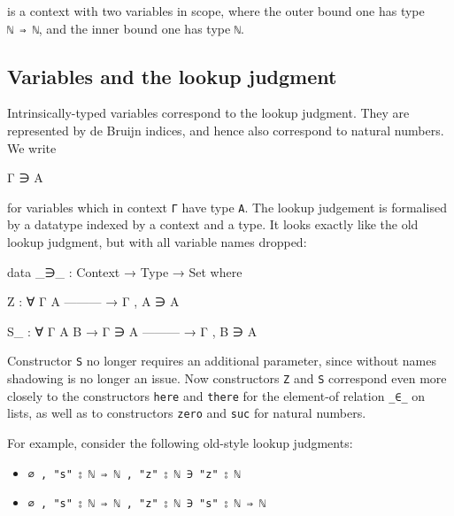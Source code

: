 is a context with two variables in scope, where the outer bound one has
type \texttt{\textasciigrave{}ℕ\ ⇒\ \textasciigrave{}ℕ}, and the inner
bound one has type \texttt{\textasciigrave{}ℕ}.

\hypertarget{variables-and-the-lookup-judgment}{%
\subsection{Variables and the lookup
judgment}\label{variables-and-the-lookup-judgment}}

Intrinsically-typed variables correspond to the lookup judgment. They
are represented by de Bruijn indices, and hence also correspond to
natural numbers. We write

\begin{myDisplay}
Γ ∋ A
\end{myDisplay}

for variables which in context \texttt{Γ} have type \texttt{A}. The
lookup judgement is formalised by a datatype indexed by a context and a
type. It looks exactly like the old lookup judgment, but with all
variable names dropped:

\begin{fence}
\begin{code}
data _∋_ : Context → Type → Set where

  Z : ∀ {Γ A}
      ---------
    → Γ , A ∋ A

  S_ : ∀ {Γ A B}
    → Γ ∋ A
      ---------
    → Γ , B ∋ A
\end{code}
\end{fence}

Constructor \texttt{S} no longer requires an additional parameter, since
without names shadowing is no longer an issue. Now constructors
\texttt{Z} and \texttt{S} correspond even more closely to the
constructors \texttt{here} and \texttt{there} for the element-of
relation \texttt{\_∈\_} on lists, as well as to constructors
\texttt{zero} and \texttt{suc} for natural numbers.

For example, consider the following old-style lookup judgments:

\begin{itemize}
\tightlist
\item
  \texttt{∅\ ,\ "s"\ ⦂\ \textasciigrave{}ℕ\ ⇒\ \textasciigrave{}ℕ\ ,\ "z"\ ⦂\ \textasciigrave{}ℕ\ ∋\ "z"\ ⦂\ \textasciigrave{}ℕ}
\item
  \texttt{∅\ ,\ "s"\ ⦂\ \textasciigrave{}ℕ\ ⇒\ \textasciigrave{}ℕ\ ,\ "z"\ ⦂\ \textasciigrave{}ℕ\ ∋\ "s"\ ⦂\ \textasciigrave{}ℕ\ ⇒\ \textasciigrave{}ℕ}
\end{itemize}

